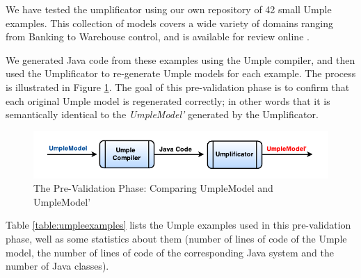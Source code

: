 We have tested the umplificator using our own repository of 42 small Umple examples. This collection of models covers a wide variety of domains ranging from Banking to Warehouse control, and is available for review online \cite{umpleexamples}.

We generated Java code from these examples using the Umple compiler, and then used the Umplificator to re-generate Umple models for each example. The process is illustrated in Figure \ref{fig:preValidation}. The goal of this pre-validation phase is to confirm that each original Umple model is regenerated correctly; in other words that it is semantically identical to the \textit{UmpleModel'}  generated by the Umplificator.
 
\begin{figure}[h]
\centering
\includegraphics{Figures/preValidation.pdf} 
\caption{The Pre-Validation Phase: Comparing UmpleModel and UmpleModel'}
\label{fig:preValidation}
\end{figure}

Table \ref{table:umpleexamples} lists the Umple examples used in this pre-validation phase, well as  some statistics about them (number of lines of code of the Umple model, the number of lines of code of the corresponding Java system and the number of Java classes).

